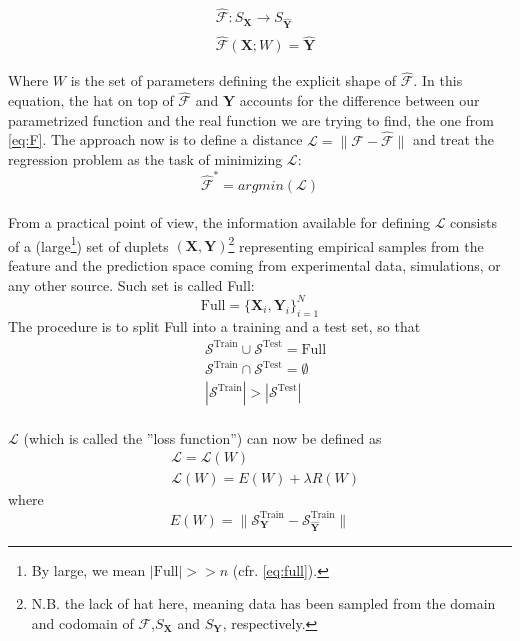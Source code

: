 \begin{align}
	& \hat{\mathcal{F}} : S_{\mathbf{X}} \rightarrow S_{\mathbf{\hat{Y}}} \\
	& \hat{\mathcal{F}}(\mathbf{X}; W) = \mathbf{\hat{Y}} \label{eq:Fhat}
\end{align}

Where $W$ is the set of parameters defining the explicit shape of $\mathcal{\hat{F}}$. In this equation, the hat on top of $\mathcal{\hat{F}}$ and $\mathbf{\hat{Y}}$ accounts for the difference between our parametrized function and the real function we are trying to find, the one from \autoref{eq:F}. The approach now is to define a distance $\mathcal{L}=\|\mathcal{F}-\mathcal{\hat{F}}\|$ and treat the regression problem as the task of minimizing $\mathcal{L}$:
\begin{equation}\label{eq:Fargmin}
	\mathcal{\hat{F}}^*=argmin(\mathcal{L})
\end{equation}\\
%
\indent From a practical point of view, the information available for defining $\mathcal{L}$ consists of a (large\footnote{By large, we mean $\left|\text{Full}\right|>>n$ (cfr. \autoref{eq:full}).}) set of duplets $(\mathbf{X},\mathbf{Y})$\footnote{N.B. the lack of hat here, meaning data has been sampled from the domain and codomain of $\mathcal{F}$,$S_\mathbf{X}$ and $S_\mathbf{Y}$, respectively.} representing empirical samples from the feature and the prediction space coming from experimental data, simulations, or any other source. Such set is called Full:
\begin{equation}\label{eq:full}
	\text{Full}=\{\mathbf{X}_i,\mathbf{Y}_i\}_{i=1}^N
\end{equation}
The procedure is to split Full into a training and a test set, so that
\begin{align}
	& \mathcal{S}^\text{Train} \cup \mathcal{S}^\text{Test} = \text{Full} \\
	& \mathcal{S}^\text{Train} \cap \mathcal{S}^\text{Test} = \emptyset \\
	& |\mathcal{S}^\text{Train}| > |\mathcal{S}^\text{Test}|
\end{align}\\
%
$\mathcal{L}$ (which is called the ''loss function'') can now be defined as
\begin{align}
	& \mathcal{L}=\mathcal{L}(W) \\
	& \mathcal{L}(W)=E(W)+\lambda R(W) \label{eq:loss}
\end{align}
where
\begin{equation}\label{eq:error}
	E(W) = \|\mathcal{S}^\text{Train}_\mathbf{Y} - \mathcal{S}^\text{Train}_\mathbf{\hat{Y}}\|
\end{equation}
